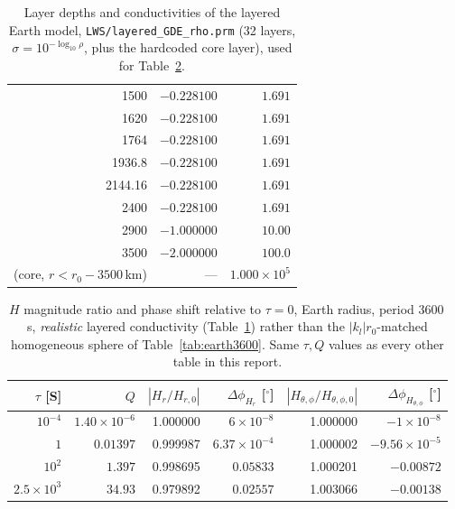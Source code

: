 \documentclass[11pt]{article}
\begin{document}
\begin{table}[h]
\begin{minipage}{0.48\textwidth}
\begin{tabular}{rrr}
1500 & $-0.228100$ & $1.691$ \\
1620 & $-0.228100$ & $1.691$ \\
1764 & $-0.228100$ & $1.691$ \\
1936.8 & $-0.228100$ & $1.691$ \\
2144.16 & $-0.228100$ & $1.691$ \\
2400 & $-0.228100$ & $1.691$ \\
2900 & $-1.000000$ & $10.00$ \\
3500 & $-2.000000$ & $100.0$ \\
(core, $r<r_0-3500$\,km) & --- & $1.000\times10^5$ \\
\bottomrule
\end{tabular}
\end{minipage}
\caption{Layer depths and conductivities of the layered Earth model, \texttt{LWS/layered\_GDE\_rho.prm}
(32 layers, $\sigma=10^{-\log_{10}\rho}$, plus the hardcoded core layer), used for
Table~\ref{tab:gderesults}.}
\label{tab:gdemodel}
\end{table}

\begin{table}[h]
\centering
\begin{tabular}{rr rr rr}
\toprule
$\tau$ [S] & $Q$ & $|H_r/H_{r,0}|$ & $\Delta\phi_{H_r}$ [$^\circ$]
           & $|H_{\theta,\phi}/H_{\theta,\phi,0}|$ & $\Delta\phi_{H_{\theta,\phi}}$ [$^\circ$] \\
\midrule
$10^{-4}$         & $1.40\times10^{-6}$ & 1.000000 & $6\times10^{-8}$   & 1.000000 & $-1\times10^{-8}$ \\
$1$               & $0.01397$           & 0.999987 & $6.37\times10^{-4}$ & 1.000002 & $-9.56\times10^{-5}$ \\
$10^{2}$          & $1.397$             & 0.998695 & $0.05833$          & 1.000201 & $-0.00872$ \\
$2.5\times10^{3}$ & $34.93$             & 0.979892 & $0.02557$          & 1.003066 & $-0.00138$ \\
\bottomrule
\end{tabular}
\caption{$H$ magnitude ratio and phase shift relative to $\tau=0$, Earth radius, period 3600\,s,
\emph{realistic} layered conductivity (Table~\ref{tab:gdemodel}) rather than the $|k_l|r_0$-matched
homogeneous sphere of Table~\ref{tab:earth3600}. Same $\tau,Q$ values as every other table in this
report.}
\label{tab:gderesults}
\end{table}
\end{document}
